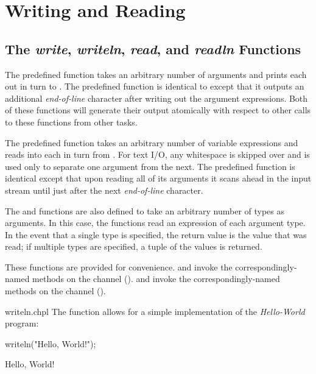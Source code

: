 \section{Writing and Reading}
\label{IO_writing_reading}


\subsection{The {\em write}, {\em writeln}, {\em read}, and {\em readln} 
Functions}

The predefined function  takes an arbitrary number of
arguments and prints each out in turn to .  The predefined
function  is identical to  except that it
outputs an additional {\em end-of-line} character after writing out
the argument expressions.  Both of these functions will generate their
output atomically with respect to other calls to these functions from
other tasks.

The predefined function  takes an arbitrary number of
variable expressions and reads into each in turn from .
For text I/O, any whitespace is skipped over and is used only to separate one
argument from the next.  The predefined function  is
identical except that upon reading all of its arguments it scans ahead
in the input stream until just after the next {\em end-of-line}
character.

The  and  functions are also defined to take
an arbitrary number of types as arguments.  In this case, the
functions read an expression of each argument type.  In the event that
a single type is specified, the return value is the value that was
read; if multiple types are specified, a tuple of the values is
returned.

These functions are provided for convenience.
 and  invoke the correspondingly-named methods
on the  channel ().
 and  invoke the correspondingly-named methods
on the  channel ().

\begin{chapelexample}{writeln.chpl}
The  function allows for a simple implementation
of the {\em Hello-World} program:
\begin{chapel}
writeln("Hello, World!");
\end{chapel}
\begin{chapelprintoutput}
Hello, World!
\end{chapelprintoutput}
\end{chapelexample}

